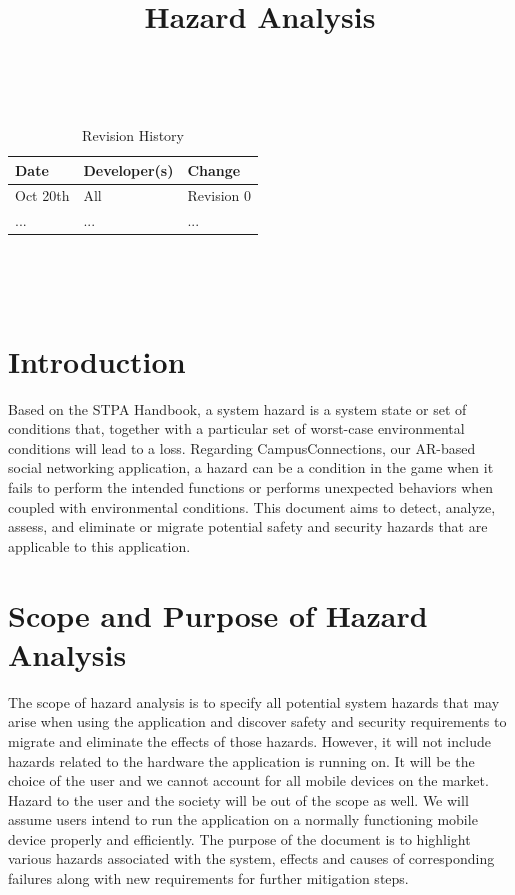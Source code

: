 \documentclass{article}
\title{Hazard Analysis\\\progname}
\author{\authname}
\date{}
\begin{document}
\maketitle
\thispagestyle{empty}

~\newpage


\begin{table}[hp]
\caption{Revision History} \label{TblRevisionHistory}
\begin{tabularx}{\textwidth}{llX}
\toprule
\textbf{Date} & \textbf{Developer(s)} & \textbf{Change}\\
\midrule
Oct 20th & All & Revision 0\\
... & ... & ...\\
\bottomrule
\end{tabularx}
\end{table}

~\newpage

\tableofcontents

~\newpage


\section{Introduction}

Based on the STPA Handbook, a system hazard is a system state or set of conditions that, together with a particular set of worst-case environmental conditions will lead to a loss. Regarding CampusConnections, our AR-based social networking application, a hazard can be a condition in the game when it fails to perform the intended functions or performs unexpected behaviors when coupled with environmental conditions. This document aims to detect, analyze, assess, and eliminate or migrate potential safety and security hazards that are applicable to this application. 

\section{Scope and Purpose of Hazard Analysis}

The scope of hazard analysis is to specify all potential system hazards that may arise when using the application and discover safety and security requirements to migrate and eliminate the effects of those hazards. However, it will not include hazards related to the hardware the application is running on. It will be the choice of the user and we cannot account for all mobile devices on the market. Hazard to the user and the society will be out of the scope as well. We will assume users intend to run the application on a normally functioning mobile device properly and efficiently. The purpose of the document is to highlight various hazards associated with the system, effects and causes of corresponding failures along with new requirements for further mitigation steps.
\end{document}

